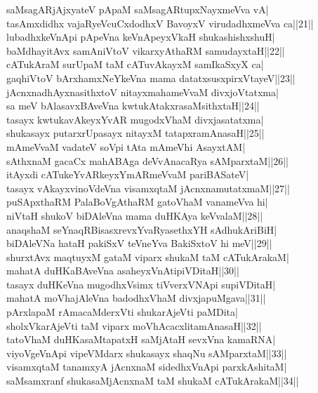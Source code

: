 \documentclass{article}
\begin{document}
saMsagARjAjxyateV pApaM saMsagARtupxNayxmeVva vA|\\
tasAmxdidhx vajaRyeVcuCxdodhxV BavoyxV virudadhxmeVva ca||21||\\
lubadhxkeVnApi pApeVna keVnApeyxVkaH shukashishxshuH|\\
baMdhayitAvx samAniVtoV vikarxyAthaRM samudayxtaH||22||\\
cATukAraM surUpaM taM cATuvAkayxM samIkaSxyX ca|\\
gaqhiVtoV bArxhamxNeYkeVna mama datatxsusxpirxVtayeV||23||\\
jAcnxnadhAyxnasithxtoV nitayxmahameVvaM divxjoVtatxma|\\
sa meV bAlasavxBAveVna kwtukAtakxrasaMsithxtaH||24||\\
tasayx kwtukavAkeyxYvAR mugodxVhaM divxjasatatxma|\\
shukasayx putarxrUpasayx nitayxM tatapxramAnasaH||25||\\
mAmeVvaM vadateV soVpi tAta mAmeVhi AsayxtAM|\\
sAthxnaM gacaCx mahABAga deVvAnacaRya sAMparxtaM||26||\\
itAyxdi cATukeYvARkeyxYmARmeVvaM pariBASateV|\\
tasayx vAkayxvinoVdeVna visamxqtaM jAcnxnamutatxmaM||27||\\
puSApxthaRM PalaBoVgAthaRM gatoVhaM vanameVva hi|\\
niVtaH shukoV biDAleVna mama duHKAya keVvalaM||28||\\
anaqshaM seYnaqRBisasxrevxYvaRyasethxYH sAdhukAriBiH|\\
biDAleVNa hataH pakiSxV teVneYva BakiSxtoV hi meV||29||\\
shurxtAvx maqtuyxM gataM viparx shukaM taM cATukArakaM|\\
mahatA duHKaBAveVna asaheyxVnAtipiVDitaH||30||\\
tasayx duHKeVna mugodhxVsimx tiVverxVNApi supiVDitaH|\\
mahatA moVhajAleVna badodhxVhaM divxjapuMgava||31||\\
pArxlapaM rAmacaMderxVti shukarAjeVti paMDita|\\
sholxVkarAjeVti taM viparx moVhAcacxlitamAnasaH||32||\\
tatoVhaM duHKasaMtapatxH saMjAtaH sevxVna kamaRNA|\\
viyoVgeVnApi vipeVMdarx shukasayx shaqNu sAMparxtaM||33||\\
visamxqtaM tanamxyA jAcnxnaM sidedhxVnApi parxkAshitaM|\\
saMsamxranf shukasaMjAcnxnaM taM shukaM cATukArakaM||34||\\
\end{document}
